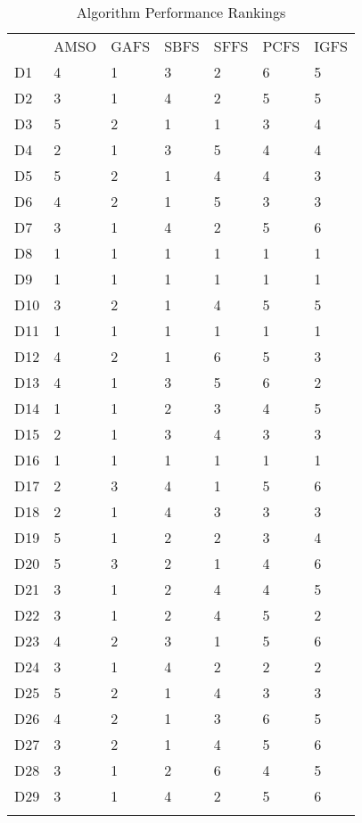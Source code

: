 \begin{table}
\caption{Algorithm Performance Rankings}
\label{tbl:algorithm:rank}
\begin{tabular}{lllllll}
\noalign{\smallskip}\hline\noalign{\smallskip}
&AMSO&GAFS&SBFS&SFFS&PCFS&IGFS\\
\noalign{\smallskip}\hline
D1&4&1&3&2&6&5\\
D2&3&1&4&2&5&5\\
D3&5&2&1&1&3&4\\
D4&2&1&3&5&4&4\\
D5&5&2&1&4&4&3\\
D6&4&2&1&5&3&3\\
D7&3&1&4&2&5&6\\
D8&1&1&1&1&1&1\\
D9&1&1&1&1&1&1\\
D10&3&2&1&4&5&5\\
D11&1&1&1&1&1&1\\
D12&4&2&1&6&5&3\\
D13&4&1&3&5&6&2\\
D14&1&1&2&3&4&5\\
D15&2&1&3&4&3&3\\
D16&1&1&1&1&1&1\\
D17&2&3&4&1&5&6\\
D18&2&1&4&3&3&3\\
D19&5&1&2&2&3&4\\
D20&5&3&2&1&4&6\\
D21&3&1&2&4&4&5\\
D22&3&1&2&4&5&2\\
D23&4&2&3&1&5&6\\
D24&3&1&4&2&2&2\\
D25&5&2&1&4&3&3\\
D26&4&2&1&3&6&5\\
D27&3&2&1&4&5&6\\
D28&3&1&2&6&4&5\\
D29&3&1&4&2&5&6\\
\noalign{\smallskip}\hline
\end{tabular}
\end{table}
